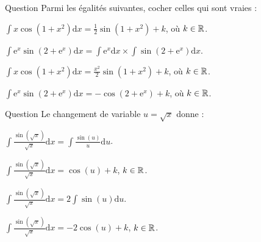 \begin{multi}[multiple,feedback=
{Avec \(u=1+x^2\), on a : \(\mathrm{d}u=2x\mathrm{d}x\) et 
\[\int x\cos(1+x^2)\mathrm{d}x=\frac{1}{2}\int \cos (u)\mathrm{d}u=\frac{1}{2}\times \sin (u)+k=\frac{1}{2}\sin(1+x^2)+k,\; k\in \Rr.\]
De même, avec \(u=2+\mathrm{e}^x\), on a : \(\mathrm{d}u=\mathrm{e}^x\mathrm{d}x\) et 
\[\int \mathrm{e}^x\sin\left(2+\mathrm{e}^x\right)\mathrm{d}x=\int \sin (u)\mathrm{d}u=-\cos (u)+k=-\cos\left(2+\mathrm{e}^x\right)+k,\; k\in \Rr.\]
}]{Question}
Parmi les égalités suivantes, cocher celles qui sont vraies :

    \item* \(\displaystyle \int x\cos(1+x^2)\mathrm{d}x=\frac{1}{2}\sin(1+x^2)+k\), où \(k\in \mathbb{R}\).
    \item \(\displaystyle \int \mathrm{e}^x\sin\left(2+\mathrm{e}^x\right)\mathrm{d}x=\int \mathrm{e}^x\mathrm{d}x\times \int\sin\left(2+\mathrm{e}^x\right)\mathrm{d}x\).
    \item \(\displaystyle \int x\cos(1+x^2)\mathrm{d}x=\frac{x^2}{2}\sin(1+x^2)+k\), où \(k\in \mathbb{R}\).
    \item* \(\displaystyle \int \mathrm{e}^x\sin\left(2+\mathrm{e}^x\right)\mathrm{d}x=-\cos\left(2+\mathrm{e}^x\right)+k\), où \(k\in \mathbb{R}\).
\end{multi}


\begin{multi}[multiple,feedback=
{Avec \(u=\sqrt{x}\), on a : \(\displaystyle \mathrm{d}u=\frac{\mathrm{d}x}{2\sqrt{x}}\). D'où
\[\int \frac{\sin (\sqrt{x})}{\sqrt{x}}\mathrm{d}x=2\int \sin (u)\mathrm{d}u=-2\cos (u)+k,\; k\in \Rr.\]
}]{Question}
Le changement de variable \(u=\sqrt{x}\) donne :

    \item \(\displaystyle \int \frac{\sin (\sqrt{x})}{\sqrt{x}}\mathrm{d}x=\int \frac{\sin (u)}{u}\mathrm{d}u\).
    \item \(\displaystyle \int \frac{\sin (\sqrt{x})}{\sqrt{x}}\mathrm{d}x=\cos (u)+k\), \(k\in \mathbb{R}\).
    \item* \(\displaystyle \int \frac{\sin (\sqrt{x})}{\sqrt{x}}\mathrm{d}x=2\int \sin (u)\mathrm{d}u\).
    \item* \(\displaystyle \int \frac{\sin (\sqrt{x})}{\sqrt{x}}\mathrm{d}x=-2\cos (u)+k\), \(k\in \mathbb{R}\).
\end{multi}


